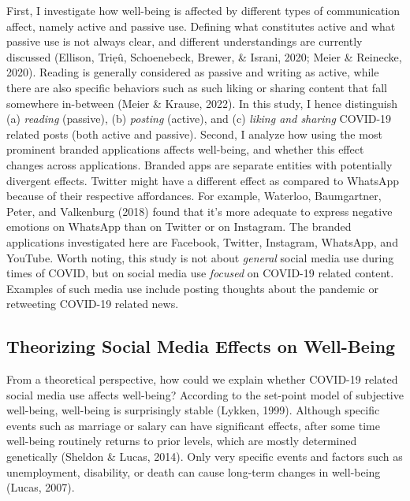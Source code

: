 \documentclass[
  man,mask]{apa6}
\begin{document}
First, I investigate how well-being is affected by different types of communication affect, namely active and passive use.
Defining what constitutes active and what passive use is not always clear, and different understandings are currently discussed (Ellison, Triẹû, Schoenebeck, Brewer, \& Israni, 2020; Meier \& Reinecke, 2020).
Reading is generally considered as passive and writing as active, while there are also specific behaviors such as such liking or sharing content that fall somewhere in-between (Meier \& Krause, 2022).
In this study, I hence distinguish (a) \emph{reading} (passive), (b) \emph{posting} (active), and (c) \emph{liking and sharing} COVID-19 related posts (both active and passive).
Second, I analyze how using the most prominent branded applications affects well-being, and whether this effect changes across applications.
Branded apps are separate entities with potentially divergent effects.
Twitter might have a different effect as compared to WhatsApp because of their respective affordances.
For example, Waterloo, Baumgartner, Peter, and Valkenburg (2018) found that it's more adequate to express negative emotions on WhatsApp than on Twitter or on Instagram.
The branded applications investigated here are Facebook, Twitter, Instagram, WhatsApp, and YouTube.
Worth noting, this study is not about \emph{general} social media use during times of COVID, but on social media use \emph{focused} on COVID-19 related content.
Examples of such media use include posting thoughts about the pandemic or retweeting COVID-19 related news.

\hypertarget{theorizing-social-media-effects-on-well-being}{%
\subsection{Theorizing Social Media Effects on Well-Being}\label{theorizing-social-media-effects-on-well-being}}

From a theoretical perspective, how could we explain whether COVID-19 related social media use affects well-being?
According to the set-point model of subjective well-being, well-being is surprisingly stable (Lykken, 1999).
Although specific events such as marriage or salary can have significant effects, after some time well-being routinely returns to prior levels, which are mostly determined genetically (Sheldon \& Lucas, 2014).
Only very specific events and factors such as unemployment, disability, or death can cause long-term changes in well-being (Lucas, 2007).
\end{document}
